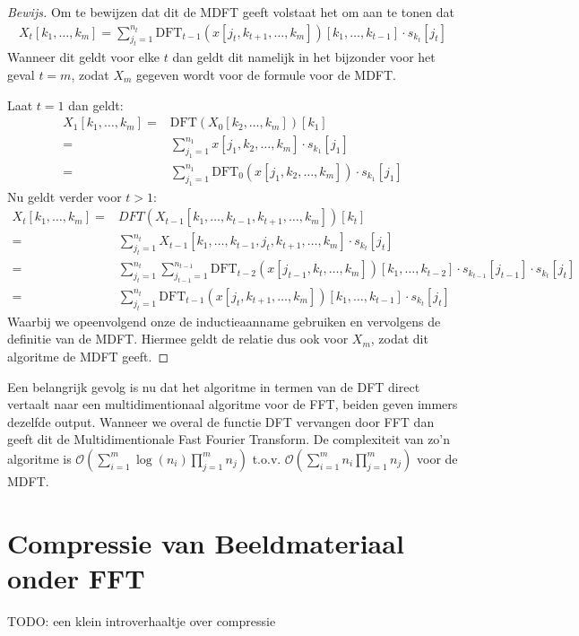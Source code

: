 \documentclass[11pt]{report}
\renewcommand{\O}{\mathcal{O}}
\theoremstyle{remark}
\newcommand{\eq}[1]{\begin{eqnarray*} #1 \end{eqnarray*}}
\newcommand{\DFT}{\text{DFT}}
\begin{document}
\begin{proof}[Bewijs]
Om te bewijzen dat dit de MDFT geeft volstaat het om aan te tonen dat
\eq{
  X_t [k_1,\ldots,k_m] = 
  \sum_{j_t = 1}^{n_t}\DFT_{t-1}(x[j_t,k_{t+1},\ldots,k_m])[k_1,\ldots,k_{t-1}] \cdot s_{k_t}[j_t]
}
Wanneer dit geldt voor elke $t$ dan geldt dit namelijk in het bijzonder voor het geval $t=m$, 
zodat $X_m$ gegeven wordt voor de formule voor de MDFT.

Laat $t=1$ dan geldt:
\eq{
  X_1[k_1,\ldots,k_m] =& \DFT(X_0[k_2,\ldots,k_m])[k_1] \\
 =&  \sum_{j_1=1}^{n_1} x[j_1,k_2,\ldots,k_m]\cdot s_{k_1}[j_1] \\
 =& \sum_{j_1=1}^{n_1} \DFT_0(x[j_1,k_2,\ldots,k_m])\cdot s_{k_1}[j_1]
}
Nu geldt verder voor $t>1$:
\eq{
  X_t[k_1,\ldots,k_m] =& DFT(X_{t-1}[k_1,\ldots,k_{t-1},k_{t+1},\ldots,k_m])[k_t] \\
           =& \sum_{j_t =1}^{n_t} X_{t-1}[k_1,\ldots,k_{t-1},j_t,k_{t+1},\ldots,k_m] \cdot s_{k_t}[j_t] \\
           =& \sum_{j_t =1}^{n_t} 
           \sum_{j_{t-1} = 1}^{n_{t-1}}
           \DFT_{t-2}(x[j_{t-1},k_t,\ldots,k_m])[k_1,\ldots,k_{t-2}] \cdot s_{k_{t-1}}[j_{t-1}]
                         \cdot s_{k_t}[j_t] \\
=&  \sum_{j_t = 1}^{n_t}\DFT_{t-1}(x[j_t,k_{t+1},\ldots,k_m])[k_1,\ldots,k_{t-1}] \cdot s_{k_t}[j_t]
}
Waarbij we opeenvolgend onze de inductieaanname gebruiken en vervolgens de definitie van de MDFT.
Hiermee geldt de relatie dus ook voor $X_m$, zodat dit algoritme de MDFT geeft.
\end{proof}

Een belangrijk gevolg is nu dat het algoritme in termen van de DFT direct vertaalt naar een multidimentionaal algoritme voor de FFT, beiden geven immers dezelfde output. 
Wanneer we overal de functie DFT vervangen door FFT dan geeft dit de Multidimentionale Fast Fourier Transform.
De complexiteit van zo'n algoritme is $\O( \sum_{i=1}^m \log(n_i) \prod_{j=1}^m n_j)$ t.o.v.
$\O( \sum_{i=1}^m n_i \prod_{j=1}^m n_j)$ voor de MDFT.

\section{Compressie van Beeldmateriaal onder FFT}

TODO: een klein introverhaaltje over compressie
\end{document}
